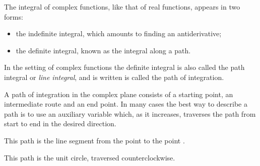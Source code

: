 
The integral of complex functions, like that of real functions, appears in two forms:

\begin{itemize}
\tightlist
\item
  the indefinite integral, which amounts to finding an antiderivative;
\item
  the definite integral, known as the integral along a path.
\end{itemize}

In the setting of complex functions the definite integral is also called the path integral or \emph{line integral}, and is written
 is called the path of integration.



A path of integration in the complex plane consists of a starting point, an intermediate route and an end point. In many cases the best way to describe a path is to use an auxiliary variable which, as it increases, traverses the path from start to end in the desired direction.



\begin{EMexample}{}

This path is the line segment from the point  to the point .

\end{EMexample}


\begin{EMexample}{}

This path is the unit circle, traversed counterclockwise.

\end{EMexample}

